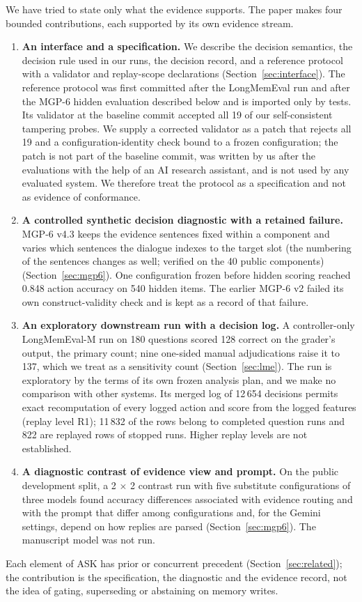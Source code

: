 We have tried to state only what the evidence supports. The paper makes four bounded contributions, each supported by its own evidence stream.
\begin{enumerate}
\item \textbf{An interface and a specification.} We describe the decision semantics, the decision rule used in our runs, the decision record, and a reference protocol with a validator and replay-scope declarations (Section~\ref{sec:interface}). The reference protocol was first committed after the LongMemEval run and after the MGP-6 hidden evaluation described below and is imported only by tests. Its validator at the baseline commit accepted all 19 of our self-consistent tampering probes. We supply a corrected validator as a patch that rejects all 19 and a configuration-identity check bound to a frozen configuration; the patch is not part of the baseline commit, was written by us after the evaluations with the help of an AI research assistant, and is not used by any evaluated system. We therefore treat the protocol as a specification and not as evidence of conformance.
\item \textbf{A controlled synthetic decision diagnostic with a retained failure.} MGP-6 v4.3 keeps the evidence sentences fixed within a component and varies which sentences the dialogue indexes to the target slot (the numbering of the sentences changes as well; verified on the 40 public components) (Section~\ref{sec:mgp6}). One configuration frozen before hidden scoring reached 0.848 action accuracy on 540 hidden items. The earlier MGP-6 v2 failed its own construct-validity check and is kept as a record of that failure.
\item \textbf{An exploratory downstream run with a decision log.} A controller-only LongMemEval-M run on 180 questions scored 128 correct on the grader's output, the primary count; nine one-sided manual adjudications raise it to 137, which we treat as a sensitivity count (Section~\ref{sec:lme}). The run is exploratory by the terms of its own frozen analysis plan, and we make no comparison with other systems. Its merged log of 12\,654 decisions permits exact recomputation of every logged action and score from the logged features (replay level R1); 11\,832 of the rows belong to completed question runs and 822 are replayed rows of stopped runs. Higher replay levels are not established.
\item \textbf{A diagnostic contrast of evidence view and prompt.} On the public development split, a 2 $\times$ 2 contrast run with five substitute configurations of three models found accuracy differences associated with evidence routing and with the prompt that differ among configurations and, for the Gemini settings, depend on how replies are parsed (Section~\ref{sec:mgp6}). The manuscript model was not run.
\end{enumerate}
Each element of ASK has prior or concurrent precedent (Section~\ref{sec:related}); the contribution is the specification, the diagnostic and the evidence record, not the idea of gating, superseding or abstaining on memory writes.

